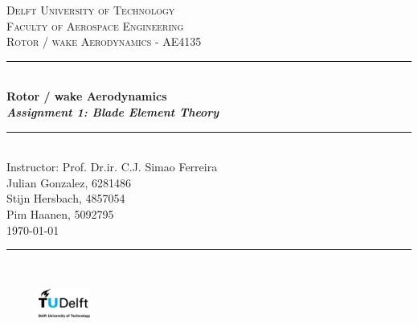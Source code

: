 \documentclass[a4paper]{memoir}
\begin{document}
\setlength{\parindent}{0em}

\AtBeginShipoutNext{\AtBeginShipoutNext{\AtBeginShipoutDiscard}}
\begin{titlingpage}

\mainmatter 

\newcommand{\HRule}{\rule{\linewidth}{0.5mm}} 				
\center 
\textsc{\Large Delft University of Technology}\\[0.5cm]
\textsc{\Large Faculty of Aerospace Engineering}\\[0.2cm]
\textsc{\large 
Rotor / wake Aerodynamics - AE4135 }\\[1cm] 							
\HRule \\[0.5cm]
{ \huge \bfseries 
Rotor / wake Aerodynamics \\ \large{\emph{Assignment 1: Blade Element Theory}} }\\[0.2cm]
\HRule \\[0.5cm]
\large
Instructor: Prof. Dr.ir. C.J. Simao Ferreira \\
Julian Gonzalez, 6281486 \\
Stijn Hersbach, 4857054 \\
Pim Haanen, 5092795 \\
\large{\large \today}\\
\vspace{5pt}
\HRule \\[0.5cm]
\vspace{5pt}





\begin{figure}[b]
\centering
\includegraphics[width=0.15\textwidth]{Figures/tu_delft_logo_jpg.png}
\end{figure}
\end{titlingpage}
\pagestyle{ruled}

\large

% 

\begin{KeepFromToc}
    \tableofcontents
\end{KeepFromToc}

% 
\setcounter{page}{2}








\printbibliography[heading=bibintoc,title=References]
\end{document}
